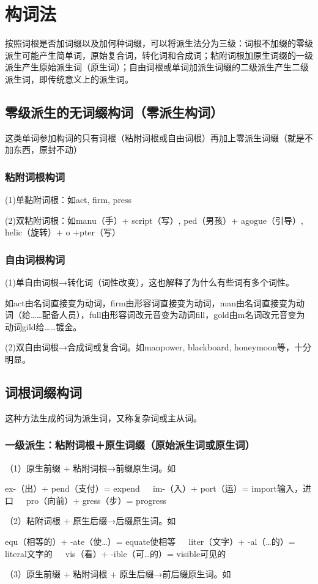 \chapter{构词法}
按照词根是否加词缀以及加何种词缀，可以将派生法分为三级：词根不加缀的零级派生可能产生简单词，原始复合词，转化词和合成词；粘附词根加原生词缀的一级派生产生原始派生词（原生词）；自由词根或单词加派生词缀的二级派生产生二级派生词，即传统意义上的派生词。
\section{零级派生的无词缀构词（零派生构词）}
这类单词参加构词的只有词根（粘附词根或自由词根）再加上零派生词缀（就是不加东西，原封不动）
\subsection{粘附词根构词}
(1)单黏附词根：如act, firm, press

(2)双粘附词根：如manu（手）+ script（写）, ped（男孩）+ agogue（引导）, helic（旋转）+ o +pter（写）
\subsection{自由词根构词}
(1)单自由词根→转化词（词性改变），这也解释了为什么有些词有多个词性。

如act由名词直接变为动词，firm由形容词直接变为动词，man由名词直接变为动词（给……配备人员），full由形容词改元音变为动词fill，gold由m名词改元音变为动词gild给……镀金。

(2)双自由词根→合成词或复合词。如manpower, blackboard, honeymoon等，十分明显。
\section{词根词缀构词}
这种方法生成的词为派生词，又称复杂词或主从词。
\subsection{一级派生：粘附词根＋原生词缀（原始派生词或原生词）}
（1）原生前缀 + 粘附词根→前缀原生词。如

ex-（出）+ pend（支付）= expend~~~im-（入）+ port（运）= import输入，进口~~~pro（向前）+ gress（步）= progress

（2）粘附词根 + 原生后缀→后缀原生词。如

equ（相等的）+ -ate（使…）= equate使相等~~~liter（文字）+ -al（…的）= literal文字的~~~vis（看）+ -ible（可…的）= visible可见的

（3）原生前缀 + 粘附词根 + 原生后缀→前后缀原生词。如

